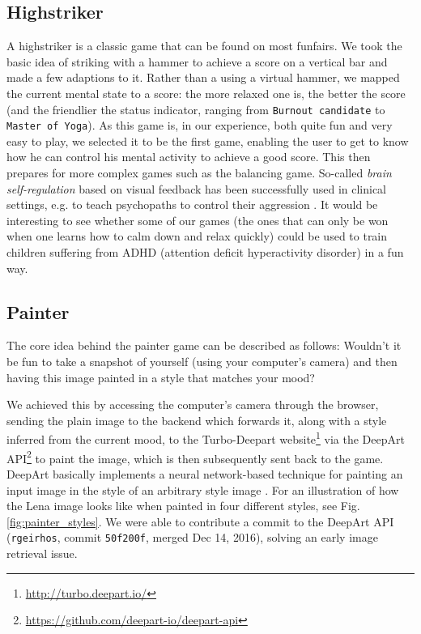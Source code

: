 \documentclass{utue} %
\begin{document}
\subsection{Highstriker}
A highstriker is a classic game that can be found on most funfairs. We took the basic idea of striking with a hammer to achieve a score on a vertical bar and made a few adaptions to it. Rather than a using a virtual hammer, we mapped the current mental state to a score: the more relaxed one is, the better the score (and the friendlier the status indicator, ranging from \texttt{Burnout candidate} to \texttt{Master of Yoga}). As this game is, in our experience, both quite fun and very easy to play, we selected it to be the first game, enabling the user to get to know how he can control his mental activity to achieve a good score. This then prepares for more complex games such as the balancing game. So-called \textit{brain self-regulation} based on visual feedback has been successfully used in clinical settings, e.g. to teach psychopaths to control their aggression \cite{Konicar2015}. It would be interesting to see whether some of our games (the ones that can only be won when one learns how to calm down and relax quickly) could be used to train children suffering from ADHD (attention deficit hyperactivity disorder) in a fun way.

\subsection{Painter}
The core idea behind the painter game can be described as follows: Wouldn't it be fun to take a snapshot of yourself (using your computer's camera) and then having this image painted in a style that matches your mood? 

We achieved this by accessing the computer's camera through the browser, sending the plain image to the backend which forwards it, along with a style inferred from the current mood, to the Turbo-Deepart website\footnote{\url{http://turbo.deepart.io/}} via the DeepArt API\footnote{\url{https://github.com/deepart-io/deepart-api}} to paint the image, which is then subsequently sent back to the game. DeepArt basically implements a neural network-based technique for painting an input image in the style of an arbitrary style image \cite{Gatys2016}. For an illustration of how the Lena image looks like when painted in four different styles, see Fig. \ref{fig:painter_styles}. We were able to contribute a commit to the DeepArt API (\texttt{rgeirhos}, commit \texttt{50f200f}, merged Dec 14, 2016), solving an early image retrieval issue.
\end{document}
